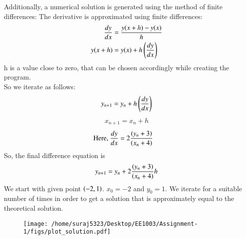\documentclass[journal]{IEEEtran}
\numberwithin{equation}{enumi}
\numberwithin{figure}{enumi}
\begin{document}
Additionally, a numerical solution is generated using the method of finite differences:
The derivative is approximated using finite differences:
	\begin{align}
    \frac{dy}{dx}&=\frac{y(x+h)-y(x)}{h}\\
    y(x+h)&=y(x)+h\left(\frac{dy}{dx}\right)
	\end{align}
h is a value close to zero, that can be chosen accordingly while creating the program.\\
So we iterate as follows:
	\begin{align}
		y_{n+1}=y_{n} + h\left(\frac{dy}{dx}\right)
	\end{align}
	\begin{align}
		x_{n+1}=x_{n}+h
	\end{align}
	\begin{align}
		\text{Here, } \frac{dy}{dx}&=2\frac{\left(y_n+3\right)}{\left(x_n+4\right)}
	\end{align}
So, the final difference equation is
	\begin{align}
		y_{n+1} = y_n + 2\frac{\left(y_n+3\right)}{\left(x_n+4\right)}h
	\end{align}
We start with given point $\left(-2,1\right)$. $x_{0}=-2$ and $y_{0}=1$. We iterate for a suitable number of times in order to get a solution that is approximately equal to the theoretical solution.
\begin{figure}[!ht]
    \centering
    \texttt{[image: /home/suraj5323/Desktop/EE1003/Assignment-1/figs/plot\_solution.pdf]}
    \caption{}
\end{figure}
\end{document}
